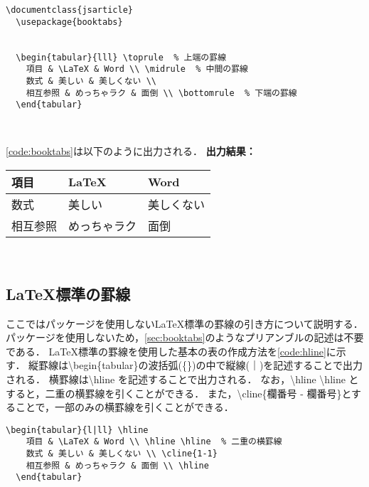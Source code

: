 \begin{lstlisting}[caption=tabular環境,label=code:booktabs]
  \documentclass{jsarticle}
  \usepackage{booktabs}
  

  \begin{tabular}{lll} \toprule  % 上端の罫線
    項目 & \LaTeX & Word \\ \midrule  % 中間の罫線
    数式 & 美しい & 美しくない \\ 
    相互参照 & めっちゃラク & 面倒 \\ \bottomrule  % 下端の罫線
  \end{tabular}

  
\end{lstlisting}

\code\ref{code:booktabs}は以下のように出力される．
\noindent\textbf{出力結果：}\hrulefill \vspace{2mm}\\
  \vspace{2mm}
  \begin{tabular}{lll} \toprule  %
    項目 & \LaTeX & Word \\ \midrule  %
    数式 & 美しい & 美しくない \\ 
    相互参照 & めっちゃラク & 面倒 \\ \bottomrule  %
  \end{tabular}
\\\noindent\hrulefill  


\subsection{\LaTeX 標準の罫線}
\label{sec:hline}

ここではパッケージを使用しない\LaTeX 標準の罫線の引き方について説明する．
パッケージを使用しないため，\ref{sec:booktabs}のようなプリアンブルの記述は不要である．
\LaTeX 標準の罫線を使用した基本の表の作成方法を\code\ref{code:hline}に示す．
縦罫線は\textbackslash begin\{tabular\}の波括弧(\{\})の中で縦線(｜)を記述することで出力される．
横罫線は\textbackslash hline を記述することで出力される．
なお，\textbackslash hline \textbackslash hline とすると，二重の横罫線を引くことができる．
また，\textbackslash cline\{欄番号 - 欄番号\}とすることで，一部のみの横罫線を引くことができる．

\begin{lstlisting}[caption=tabular環境,label=code:hline]
  \begin{tabular}{l|ll} \hline
    項目 & \LaTeX & Word \\ \hline \hline  % 二重の横罫線
    数式 & 美しい & 美しくない \\ \cline{1-1}
    相互参照 & めっちゃラク & 面倒 \\ \hline
  \end{tabular}
\end{lstlisting}

